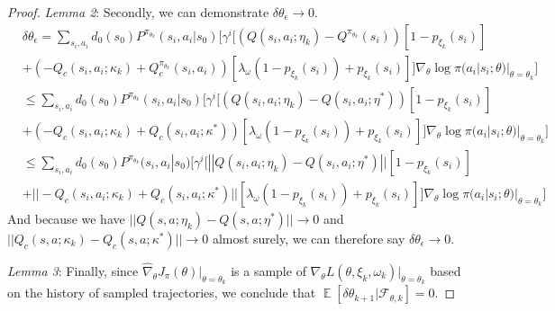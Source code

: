 \documentclass{article}
\theoremstyle{definition}
\DeclareMathOperator*{\E}{\mathbb{E}}
\begin{document}
\begin{proof}
\emph{Lemma 2}: Secondly, we can demonstrate $\delta \theta_\epsilon\rightarrow 0$.
\begin{align*}
    &\delta \theta_\epsilon = \sum_{s_i,a_i} d_0(s_0)P^{\pi_{\theta_k}}(s_i,a_i|s_0)\biggl[\gamma^i \bigl[(Q(s_i,a_i;\eta_k)-Q^{\pi_{\theta_k}}(s_i)) [1 - p_{\xi_k}(s_i)] \\
    &+ (-Q_c(s_i,a_i; \kappa_k)+Q^{\pi_{\theta_k}}_c(s_i,a_i)) [\lambda_\omega (1 - p_{\xi_k}(s_i)) + p_{\xi_k}(s_i)]\bigr]\nabla_\theta \log \pi(a_i | s_i; \theta) |_{\theta=\theta_k}\biggr]\\
    &\leq \sum_{s_i,a_i} d_0(s_0)P^{\pi_{\theta_k}}(s_i,a_i|s_0)\biggl[\gamma^i \bigl[(Q(s_i,a_i;\eta_k)-Q(s_i,a_i;\eta^*)) [1 - p_{\xi_k}(s_i)] \\
    &+ (-Q_c(s_i,a_i; \kappa_k)+Q_c(s_i,a_i; \kappa^*)) [\lambda_\omega (1 - p_{\xi_k}(s_i)) + p_{\xi_k}(s_i)]\bigr]\nabla_\theta \log \pi(a_i | s_i; \theta) |_{\theta=\theta_k}\biggr]\\
    &\leq \sum_{s_i,a_i} d_0(s_0)P^{\pi_{\theta_k}}(s_i,a_i|s_0)\biggl[\gamma^i \bigl[||Q(s_i,a_i;\eta_k)-Q(s_i,a_i;\eta^*)|| [1 - p_{\xi_k}(s_i)] \\
    &+ ||-Q_c(s_i,a_i; \kappa_k)+Q_c(s_i,a_i; \kappa^*)|| [\lambda_\omega (1 - p_{\xi_k}(s_i)) + p_{\xi_k}(s_i)]\bigr]\nabla_\theta \log \pi(a_i | s_i; \theta) |_{\theta=\theta_k}\biggr]
\end{align*}
And because we have $||Q(s,a;\eta_k)-Q(s,a;\eta^*)||\rightarrow 0$ and $||Q_c(s,a;\kappa_k)-Q_c(s,a;\kappa^*)||\rightarrow 0$ almost surely, we can therefore say $\delta\theta_\epsilon\rightarrow 0$.

\emph{Lemma 3}: Finally, since $\hat{\nabla}_\theta J_\pi (\theta)|_{\theta=\theta_k}$ is a sample of $\nabla_\theta L(\theta, \xi_k, \omega_k)|_{\theta=\theta_k}$ based on the history of sampled trajectories, we conclude that $\E[\delta \theta_{k+1} | \mathcal{F}_{\theta,k}]=0$.


\end{proof}
\end{document}
